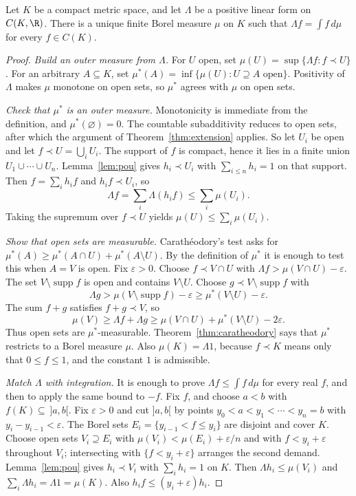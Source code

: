\begin{theorem}\label{thm:riesz}
Let $K$ be a compact metric space, and let $\Lambda$ be a positive linear form on $C(K,\R)$. There is a unique finite Borel measure $\mu$ on
$K$ such that $\Lambda f=\int f\,d\mu$ for every $f\in C(K)$.
\end{theorem}
\begin{proof}
\emph{Build an outer measure from $\Lambda$.} For $U$ open, set $\mu(U)=\sup\{\Lambda f:f\prec U\}$. For an arbitrary $A\subseteq K$, set
$\mu^*(A)=\inf\{\mu(U):U\supseteq A\text{ open}\}$. Positivity of $\Lambda$ makes $\mu$ monotone on open sets, so $\mu^*$ agrees with $\mu$ on
open sets.

\emph{Check that $\mu^*$ is an outer measure.} Monotonicity is immediate from the definition, and $\mu^*(\varnothing)=0$. The countable
subadditivity reduces to open sets, after which the argument of Theorem~\ref{thm:extension} applies. So let $U_i$ be open and let
$f\prec U=\bigcup_i U_i$. The support of $f$ is compact, hence it lies in a finite union $U_1\cup\cdots\cup U_n$. Lemma~\ref{lem:pou} gives
$h_i\prec U_i$ with $\sum_{i\le n}h_i=1$ on that support. Then $f=\sum_i h_if$ and $h_if\prec U_i$, so
\[\Lambda f=\sum_i\Lambda(h_if)\le\sum_i\mu(U_i).\]
Taking the supremum over $f\prec U$ yields $\mu(U)\le\sum_i\mu(U_i)$.

\emph{Show that open sets are measurable.} Carath\'eodory's test asks for $\mu^*(A)\ge\mu^*(A\cap U)+\mu^*(A\setminus U)$. By the definition of
$\mu^*$ it is enough to test this when $A=V$ is open. Fix $\varepsilon>0$. Choose $f\prec V\cap U$ with $\Lambda f>\mu(V\cap U)-\varepsilon$. The set
$V\setminus\operatorname{supp}f$ is open and contains $V\setminus U$. Choose $g\prec V\setminus\operatorname{supp}f$ with
\[\Lambda g>\mu(V\setminus\operatorname{supp}f)-\varepsilon\ge\mu^*(V\setminus U)-\varepsilon.\]
The sum $f+g$ satisfies $f+g\prec V$, so
\[\mu(V)\ge\Lambda f+\Lambda g\ge\mu(V\cap U)+\mu^*(V\setminus U)-2\varepsilon.\]
Thus open sets are $\mu^*$-measurable. Theorem~\ref{thm:caratheodory} says that $\mu^*$ restricts to a Borel measure $\mu$. Also
$\mu(K)=\Lambda 1$, because $f\prec K$ means only that $0\le f\le 1$, and the constant $1$ is admissible.

\emph{Match $\Lambda$ with integration.} It is enough to prove $\Lambda f\le\int f\,d\mu$ for every real $f$, and then to apply the same bound
to $-f$. Fix $f$, and choose $a<b$ with $f(K)\subseteq\,]a,b[$. Fix $\varepsilon>0$ and cut $]a,b[$ by points $y_0<a<y_1<\cdots<y_n=b$ with
$y_i-y_{i-1}<\varepsilon$. The Borel sets $E_i=\{y_{i-1}<f\le y_i\}$ are disjoint and cover $K$. Choose open sets $V_i\supseteq E_i$ with
$\mu(V_i)<\mu(E_i)+\varepsilon/n$ and with $f<y_i+\varepsilon$ throughout $V_i$; intersecting with $\{f<y_i+\varepsilon\}$ arranges the second demand.
Lemma~\ref{lem:pou} gives $h_i\prec V_i$ with $\sum_i h_i=1$ on $K$. Then $\Lambda h_i\le\mu(V_i)$ and $\sum_i\Lambda h_i=\Lambda 1=\mu(K)$. Also
$h_if\le(y_i+\varepsilon)h_i$.


\end{proof}
